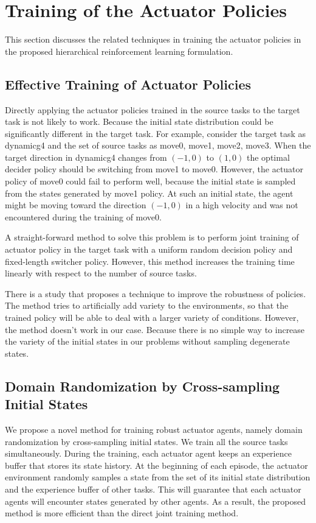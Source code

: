 \section{Training of the Actuator Policies}
This section discusses the related techniques in training the actuator policies in the proposed hierarchical reinforcement learning formulation.
\subsection{Effective Training of Actuator Policies}
Directly applying the actuator policies trained in the source tasks to the target task is not likely to work. Because the initial state distribution could be significantly different in the target task.
For example, consider the target task as dynamicg4 and the set of source tasks as move0, move1, move2, move3. When the target direction in dynamicg4 changes from $(-1,0)$ to $(1,0)$ the optimal decider policy should be switching from move1 to move0. However, the actuator policy of move0 could fail to perform well, because the initial state is sampled from the states generated by move1 policy. At such an initial state, the agent might be moving toward the direction $(-1,0)$ in a high velocity and was not encountered during the training of move0.

A straight-forward method to solve this problem is to perform joint training of actuator policy in the target task with a uniform random decision policy and fixed-length switcher policy. However, this method increases the training time linearly with respect to the number of source tasks.

There is a study \cite{tobin2017domain} that proposes a technique to improve the robustness of policies. The method tries to artificially add variety to the environments, so that the trained policy will be able to deal with a larger variety of conditions. However, the method doesn't work in our case. Because there is no simple way to increase the variety of the initial states in our problems without sampling degenerate states. 

\subsection{Domain Randomization by Cross-sampling Initial States}
We propose a novel method for training robust actuator agents, namely domain randomization by cross-sampling initial states. We train all the source tasks simultaneously. During the training, each actuator agent keeps an experience buffer that stores its state history. At the beginning of each episode, the actuator environment randomly samples a state from the set of its initial state distribution and the experience buffer of other tasks. This will guarantee that each actuator agents will encounter states generated by other agents. As a result, the proposed method is more efficient than the direct joint training method.

